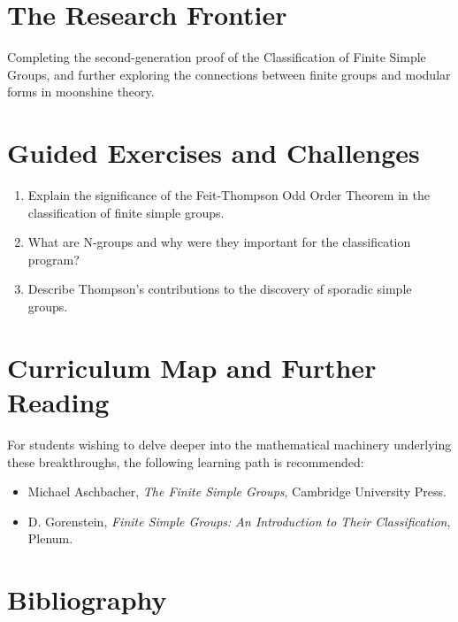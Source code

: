 \section{The Research Frontier}
Completing the second-generation proof of the Classification of Finite Simple Groups, and further exploring the connections between finite groups and modular forms in moonshine theory.

\section{Guided Exercises and Challenges}
\begin{enumerate}[label=\textbf{\arabic*.}]
  \item Explain the significance of the Feit-Thompson Odd Order Theorem in the classification of finite simple groups.
  \item What are N-groups and why were they important for the classification program?
  \item Describe Thompson's contributions to the discovery of sporadic simple groups.
\end{enumerate}

\section{Curriculum Map and Further Reading}
For students wishing to delve deeper into the mathematical machinery underlying these breakthroughs, the following learning path is recommended:
\begin{itemize}
  \item Michael Aschbacher, \emph{The Finite Simple Groups}, Cambridge University Press.
  \item D. Gorenstein, \emph{Finite Simple Groups: An Introduction to Their Classification}, Plenum.
\end{itemize}

\section*{Bibliography}

